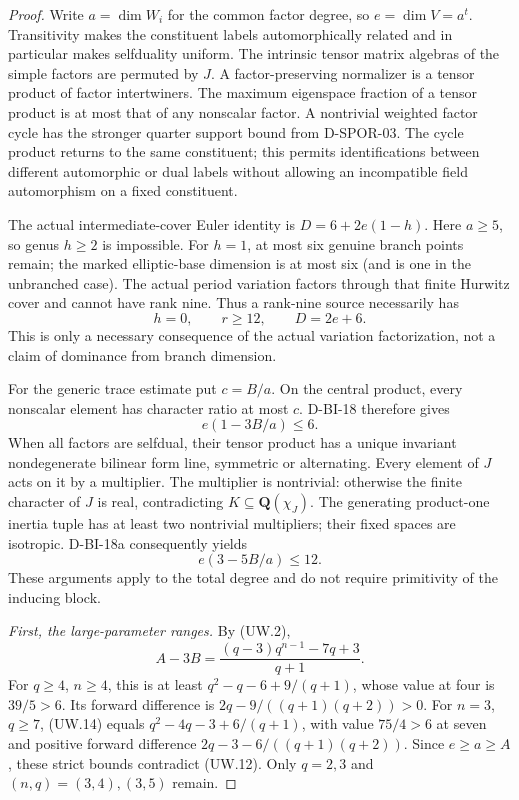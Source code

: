 \begin{proof}
Write $a=\dim W_i$ for the common factor degree, so $e=\dim V=a^t$.
Transitivity makes the constituent labels automorphically
related and in particular makes selfduality uniform.
The intrinsic tensor matrix algebras of the simple factors
are permuted by $J$. A factor-preserving normalizer is a
tensor product of factor intertwiners. The maximum eigenspace
fraction of a tensor product is at most that of any nonscalar
factor. A nontrivial weighted factor cycle has the stronger
quarter support bound from D-SPOR-03. The cycle product returns
to the same constituent; this permits identifications between
different automorphic or dual labels without allowing an
incompatible field automorphism on a fixed constituent.

The actual intermediate-cover Euler identity is
$D=6+2e(1-h)$. Here $a\ge5$, so genus $h\ge2$ is impossible.
For $h=1$, at most six genuine branch points remain; the
marked elliptic-base dimension is at most six (and is one
in the unbranched case). The actual period variation factors
through that finite Hurwitz cover and cannot have rank nine.
Thus a rank-nine source necessarily has
\[
                h=0,\qquad r\ge12,\qquad D=2e+6.            \tag{UW.11}
\]
This is only a necessary consequence of the actual variation
factorization, not a claim of dominance from branch dimension.

For the generic trace estimate put $c=B/a$. On the central
product, every nonscalar element has character ratio at
most $c$. D-BI-18 therefore gives
\[
                       e(1-3B/a)\le6.                      \tag{UW.12}
\]
When all factors are selfdual, their tensor product has a
unique invariant nondegenerate bilinear form line, symmetric
or alternating. Every element of $J$ acts on it by a multiplier.
The multiplier is nontrivial: otherwise the finite character
of $J$ is real, contradicting $K\subseteq\mathbf Q(\chi_J)$.
The generating product-one inertia tuple has at least two
nontrivial multipliers; their fixed spaces are isotropic.
D-BI-18a consequently yields
\[
                       e(3-5B/a)\le12.                     \tag{UW.13}
\]
These arguments apply to the total degree and do not require
primitivity of the inducing block.

\emph{First, the large-parameter ranges.}
By (UW.2),
\[
 A-3B=\frac{(q-3)q^{n-1}-7q+3}{q+1}.                       \tag{UW.14}
\]
For $q\ge4$, $n\ge4$, this is at least
$q^2-q-6+9/(q+1)$, whose value at four is $39/5>6$.
Its forward difference is $2q-9/((q+1)(q+2))>0$.
For $n=3$, $q\ge7$, (UW.14) equals
$q^2-4q-3+6/(q+1)$, with value $75/4>6$ at seven
and positive forward difference
$2q-3-6/((q+1)(q+2))$.
Since $e\ge a\ge A$, these strict bounds contradict (UW.12).
Only $q=2,3$ and $(n,q)=(3,4),(3,5)$ remain.


\end{proof}
